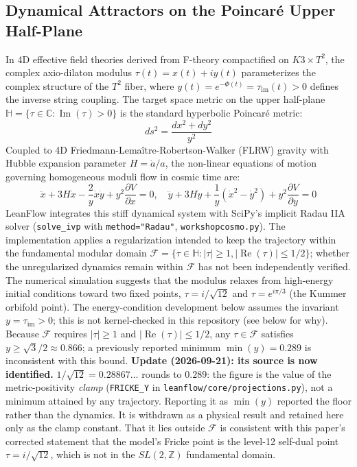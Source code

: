 \documentclass[11pt,a4paper]{article}
\begin{document}
\subsection{Dynamical Attractors on the Poincar\'e Upper Half-Plane}
In 4D effective field theories derived from F-theory compactified on $K3 \times T^2$, the complex axio-dilaton modulus $\tau(t) = x(t) + i y(t)$ parameterizes the complex structure of the $T^2$ fiber, where $y(t) = e^{-\Phi(t)} = \tau_{\text{im}}(t) > 0$ defines the inverse string coupling. The target space metric on the upper half-plane $\mathbb{H} = \{\tau \in \mathbb{C} : \operatorname{Im}(\tau) > 0\}$ is the standard hyperbolic Poincar\'e metric:
\begin{equation}
ds^2 = \frac{dx^2 + dy^2}{y^2}
\end{equation}
Coupled to 4D Friedmann-Lema\^itre-Robertson-Walker (FLRW) gravity with Hubble expansion parameter $H = \dot{a}/a$, the non-linear equations of motion governing homogeneous moduli flow in cosmic time are:
\begin{equation}
\ddot{x} + 3 H \dot{x} - \frac{2}{y} \dot{x}\dot{y} + y^2 \frac{\partial V}{\partial x} = 0, \quad
\ddot{y} + 3 H \dot{y} + \frac{1}{y}(\dot{x}^2 - \dot{y}^2) + y^2 \frac{\partial V}{\partial y} = 0
\end{equation}
LeanFlow integrates this stiff dynamical system with SciPy's implicit Radau IIA solver (\texttt{solve\_ivp} with \texttt{method="Radau"}, \texttt{workshopcosmo.py}). The implementation applies a regularization intended to keep the trajectory within the fundamental modular domain $\mathcal{F} = \{ \tau \in \mathbb{H} : |\tau| \ge 1, |\operatorname{Re}(\tau)| \le 1/2 \}$; whether the unregularized dynamics remain within $\mathcal{F}$ has not been independently verified. The numerical simulation suggests that the modulus relaxes from high-energy initial conditions toward two fixed points, $\tau = i/\sqrt{12}$ and $\tau = e^{i\pi/3}$ (the Kummer orbifold point). The energy-condition development below assumes the invariant $y = \tau_{\text{im}} > 0$; this is not kernel-checked in this repository (see below for why). Because $\mathcal{F}$ requires $|\tau| \ge 1$ and $|\operatorname{Re}(\tau)| \le 1/2$, any $\tau \in \mathcal{F}$ satisfies $y \ge \sqrt{3}/2 \approx 0.866$; a previously reported minimum $\min(y) = 0.289$ is inconsistent with this bound. \textbf{Update (2026-09-21): its source is now identified.} $1/\sqrt{12} = 0.28867\ldots$ rounds to $0.289$: the figure is the value of the metric-positivity \emph{clamp} (\texttt{FRICKE\_Y} in \texttt{leanflow/core/projections.py}), not a minimum attained by any trajectory. Reporting it as $\min(y)$ reported the floor rather than the dynamics. It is withdrawn as a physical result and retained here only as the clamp constant. That it lies outside $\mathcal{F}$ is consistent with this paper's corrected statement that the model's Fricke point is the level-12 self-dual point $\tau = i/\sqrt{12}$, which is not in the $SL(2,\mathbb{Z})$ fundamental domain.
\end{document}

